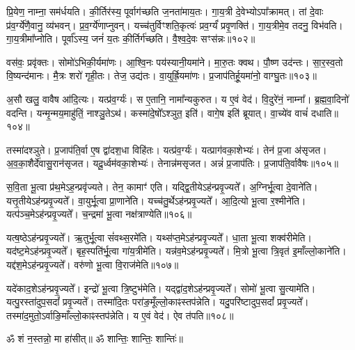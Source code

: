 प्रि॒येण॒ नाम्ना॒ सम॑र्धयति। 
की॒र्तिर॑स्य॒ पूर्वाग॑च्छति ज॒नता॑माय॒तः। 
गा॒य॒त्री दे॒वेभ्योऽपा᳚क्रामत्। 
तां दे॒वाः प्र॑व॒र्ग्ये॑णै॒वानु॒ व्य॑भवन्। 
प्र॒व॒र्ग्ये॑णाप्नुवन्। 
यच्च॑तुर्विꣳशति॒कृत्वः॑ प्रव॒र्ग्यं॑ प्रवृ॒णक्ति॑। 
गा॒य॒त्रीमे॒व तदनु॒ विभ॑वति। 
गा॒य॒त्रीमा᳚प्नोति। 
पूर्वा᳚ऽस्य॒ जनं॑ य॒तः की॒र्तिर्ग॑च्छति। 
वै॒श्व॒दे॒वः सꣳस॑न्नः॥१०२॥

वस॑वः॒ प्रवृ॑क्तः। 
सोमो॑ऽभिकी॒र्यमा॑णः। 
आ॒श्वि॒नः पय॑स्यानी॒यमा॑ने। 
मा॒रु॒तः क्वथ\sn{}। 
पौ॒ष्ण उद॑न्तः। 
सा॒र॒स्व॒तो वि॒ष्यन्द॑मानः। 
मै॒त्रः  शरो॑ गृही॒तः। 
तेज॒ उद्य॑तः। 
वा॒युर्ह्रि॒यमा॑णः। 
प्र॒जाप॑तिर्\mbox{}हू॒यमा॑नो॒ वाग्घु॒तः॥१०३॥

अ॒सौ खलु॒ वावैष आ॑दि॒त्यः। 
यत्प्र॑व॒र्ग्यः॑। 
स ए॒तानि॒ नामा᳚न्यकुरुत। 
य ए॒वं वेद॑। 
वि॒दुरे॑नं॒ नाम्ना᳚। 
ब्र॒ह्म॒वा॒दिनो॑ वदन्ति। 
यन्मृ॒न्मय॒माहु॑तिं॒ नाश्ञु॒तेऽथ॑। 
कस्मा॑दे॒षो᳚ऽश्ञुत॒ इति॑। 
वागे॒ष इति॑ ब्रूयात्। 
वा॒च्ये॑व वाचं॑ दधाति॥१०४॥

तस्मा॑दश्ञुते। 
प्र॒जाप॑ति॒र्वा ए॒ष द्वा॑दश॒धा विहि॑तः। 
यत्प्र॑व॒र्ग्यः॑। 
यत्प्राग॑वका॒शेभ्यः॑। 
तेन॑ प्र॒जा अ॑सृजत। 
अ॒व॒का॒शैर्दे॑वासु॒रान॑सृजत। 
यदू॒र्ध्वम॑वका॒शेभ्यः॑। 
तेनान्न॑म\-सृजत। 
अन्नं॑ प्र॒जाप॑तिः। 
प्र॒जाप॑ति॒र्वावैषः॥१०५॥
\anuvakamend[व॒द॒न्ति॒ त॒नुवा॒ सꣳस॑न्नो हू॒यमा॑नो॒ वाग्घु॒तो द॑धात्ये॒षः]

स॒वि॒ता भू॒त्वा प्र॑थ॒मेऽह॒न्प्रवृ॑ज्यते। 
तेन॒ कामाꣳ॑ एति। 
यद्द्वि॒तीयेऽह॑न्प्रवृ॒ज्यते᳚। 
अ॒ग्निर्भू॒त्वा दे॒वाने॑ति। 
यत्तृ॒तीयेऽह॑न्प्र\-वृ॒ज्यते᳚। 
वा॒युर्भू॒त्वा प्रा॒णाने॑ति। 
यच्च॑तु॒र्थेऽह॑न्प्रवृ॒ज्यते᳚। 
आ॒दि॒त्यो भू॒त्वा र॒श्मीने॑ति। 
यत्प॑ञ्च॒मेऽह॑न्प्रवृ॒ज्यते᳚। 
च॒न्द्रमा॑ भू॒त्वा नक्ष॑त्राण्येति॥१०६॥

यत्ष॒ष्ठेऽह॑न्प्रवृ॒ज्यते᳚। 
ऋ॒तुर्भू॒त्वा सं॑वथ्स॒रमे॑ति। 
यथ्स॑प्त॒मेऽह॑न्प्र\-वृ॒ज्यते᳚। 
धा॒ता भू॒त्वा शक्व॑रीमेति। 
यद॑ष्ट॒मेऽह॑न्प्रवृ॒ज्यते᳚। 
बृह॒स्पति॑र्भू॒त्वा गा॑य॒त्रीमे॑ति। 
यन्न॑व॒मेऽह॑न्प्रवृ॒ज्यते᳚। 
मि॒त्रो भू॒त्वा त्रि॒वृत॑ इ॒माँल्लो॒काने॑ति। 
यद्द॑श॒मेऽह॑न्प्रवृ॒ज्यते᳚। 
वरु॑णो भू॒त्वा वि॒राज॑मेति॥१०७॥

यदे॑काद॒शेऽह॑न्प्रवृ॒ज्यते᳚। 
इन्द्रो॑ भू॒त्वा त्रि॒ष्टुभ॑मेति। 
यद्द्वा॑द॒शेऽह॑न्प्र\-वृ॒ज्यते᳚। 
सोमो॑ भू॒त्वा सु॒त्यामे॑ति। 
यत्पु॒रस्ता॑दुप॒सदां᳚ प्रवृ॒ज्यते᳚। 
तस्मा॑दि॒तः परा॑ङ॒मूँल्लो॒काꣴ\-स्तप॑न्नेति। 
यदु॒परि॑ष्टादुप॒सदां᳚ प्रवृ॒ज्यते᳚। 
तस्मा॑द॒मुतो॒ऽर्वा\-ङि॒माँल्लो॒काꣴ\-स्तप॑न्नेति। 
य ए॒वं वेद॑। 
ऐव त॑पति॥१०८॥
\anuvakamend[नक्ष॑त्राण्येति वि॒राज॑मेति तपति]

ॐ शं न॒स्तन्नो॒ मा हा॑सीत्॥ ॐ शान्तिः॒ शान्तिः॒ शान्तिः॑॥

\closesection